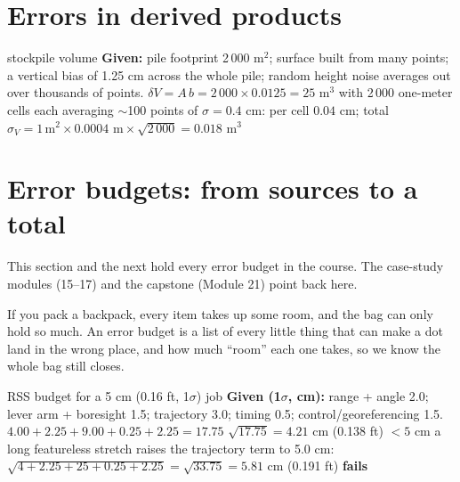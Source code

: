 \section{Errors in derived products}
\begin{worked}{stockpile volume}
\textbf{Given:} pile footprint 2\,000 m$^2$; surface built from many points; a vertical bias of 1.25 cm across the whole pile; random height noise averages out over thousands of points.
 $\delta V=A\,b=2\,000\times0.0125=25$ m$^3$
 with 2\,000 one-meter cells each averaging $\sim$100 points of $\sigma=0.4$ cm: per cell $0.04$ cm; total $\sigma_V=1\,\text{m}^2\times0.0004\text{ m}\times\sqrt{2\,000}=0.018$ m$^3$
\end{worked}

\section{Error budgets: from sources to a total}\label{sec:budgets}
This section and the next hold every error budget in the course. The case-study modules (15--17) and the capstone (Module 21) point back here.


\begin{kid}
If you pack a backpack, every item takes up some room, and the bag can only hold so much. An error budget is a list of every little thing that can make a dot land in the wrong place, and how much ``room'' each one takes, so we know the whole bag still closes.
\end{kid}


\begin{worked}{RSS budget for a 5 cm (0.16 ft, 1$\sigma$) job}
\textbf{Given (1$\sigma$, cm):} range + angle 2.0; lever arm + boresight 1.5; trajectory 3.0; timing 0.5; control/georeferencing 1.5.
 $4.00+2.25+9.00+0.25+2.25=17.75$
 $\sqrt{17.75}=4.21$ cm (0.138 ft) $<5$ cm \checkmark
{} a long featureless stretch raises the trajectory term to 5.0 cm: $\sqrt{4+2.25+25+0.25+2.25}=\sqrt{33.75}=5.81$ cm (0.191 ft) \textbf{fails}
\end{worked}

